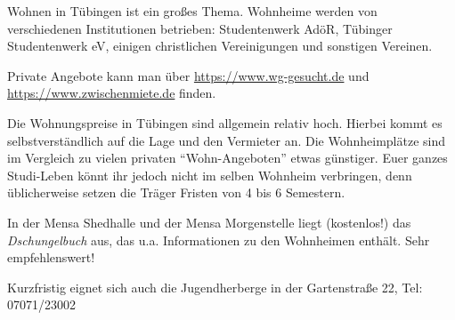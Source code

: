 Wohnen in Tübingen ist ein großes Thema.  Wohnheime werden von verschiedenen Institutionen betrieben: Studentenwerk AdöR, Tübinger Studentenwerk eV, einigen christlichen Vereinigungen und sonstigen Vereinen. 

Private Angebote kann man über \url{https://www.wg-gesucht.de} und \url{https://www.zwischenmiete.de} finden.	%

Die Wohnungspreise in Tübingen sind allgemein relativ hoch. Hierbei kommt es selbstverständlich auf die Lage und den Vermieter an. Die Wohnheimplätze sind im Vergleich zu vielen privaten "`Wohn-Angeboten"' etwas günstiger.  Euer ganzes Studi-Leben könnt ihr jedoch nicht im selben Wohnheim verbringen, denn üblicherweise setzen die Träger Fristen von 4 bis 6 Semestern.


In der Mensa Shedhalle und der Mensa Morgenstelle liegt (kostenlos!) das \emph{Dschungelbuch} aus, das u.a. Informationen zu den Wohnheimen enthält. Sehr empfehlenswert!

Kurzfristig eignet sich auch die Jugendherberge in der Gartenstraße 22, Tel: 07071/23002
